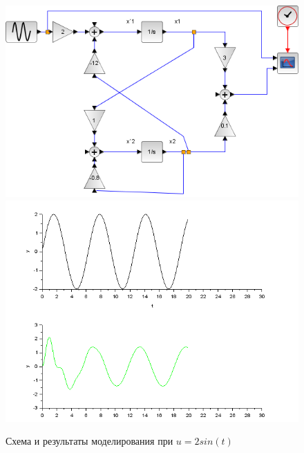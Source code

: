 \documentclass[a4paper,12pt,russian]{article} %
\begin{document}
\begin{figure}[H]
	\includegraphics[width=1\textwidth]{всв-схема-sin}
	\includegraphics[width=1\textwidth]{всв-sin}
	\caption{Схема и результаты моделирования при   $u=2sin(t)$}
\end{figure}
\end{document}
